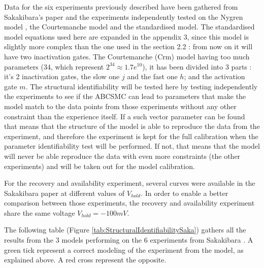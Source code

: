 \documentclass[11pt]{report}
\begin{document}
Data for the six experiments previously described have been gathered from Sakakibara's paper \cite{Sakakibara1992} and the experiments independently tested on the Nygren model \cite{Nygren1998}, the Courtemanche model \cite{Courtemanche1998} and the standardised model. The standardised model equations used here are expanded in the appendix 3, since this model is slightly more complex than the one used in the section 2.2 : from now on it will have two inactivation gates. The Courtemanche (Crm) \cite{Courtemanche1998} model having too much parameters (34, which represent $2^{34} \approx 1.7e^{10}$), it has been divided into 3 parts : it's 2 inactivation gates, the slow one $j$ and the fast one $h$; and the activation gate $m$. The structural identifiability will be tested here by testing independently the experiments to see if the ABCSMC can lead to parameters that make the model match to the data points from those experiments without any other constraint than the experience itself. If a such vector parameter can be found that means that the structure of the model is able to reproduce the data from the experiment, and therefore the experiment is kept for the full calibration when the parameter identifiability test will be performed. If not, that means that the model will never be able reproduce the data with even more constraints (the other experiments) and will be taken out for the model calibration.

For the recovery and availability experiment, several curves were available in the Sakakibara paper \cite{Sakakibara1992} at different values of $V_{hold}$. In order to enable a better comparison between those experiments, the recovery and availability experiment share the same voltage $V_{hold} = -100 mV$. 

The following table (Figure \ref{tab:StructuralIdentifiabilitySaka}) gathers all the results from the 3 models performing on the 6 experiments from Sakakibara \cite{Sakakibara1992}. A green tick represent a correct modeling of the experiment from the model, as explained above. A red cross represent the opposite.
\end{document}
